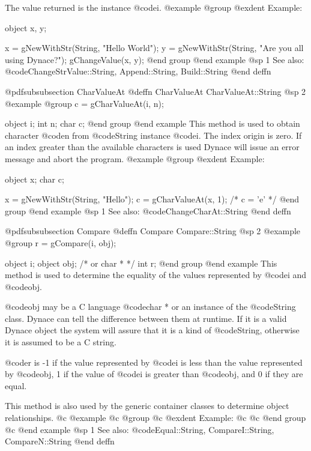 The value returned is the instance @code{i}.
@example
@group
@exdent Example:

object  x, y;

x = gNewWithStr(String, "Hello World");
y = gNewWithStr(String, "Are you all using Dynace?");
gChangeValue(x, y);
@end group
@end example
@sp 1
See also:  @code{ChangeStrValue::String, Append::String, Build::String}
@end deffn











@pdfsubsubsection {CharValueAt}
@deffn {CharValueAt} CharValueAt::String
@sp 2
@example
@group
c = gCharValueAt(i, n);

object  i;
int     n;
char    c;
@end group
@end example
This method is used to obtain character @code{n} from @code{String} instance
@code{i}.  The index origin is zero.  If an index greater than the available
characters is used Dynace will issue an error message and abort the program.
@example
@group
@exdent Example:

object  x;
char    c;

x = gNewWithStr(String, "Hello");
c = gCharValueAt(x, 1);
/*  c = 'e'  */
@end group
@end example
@sp 1
See also:  @code{ChangeCharAt::String}
@end deffn









@pdfsubsubsection {Compare}
@deffn {Compare} Compare::String
@sp 2
@example
@group
r = gCompare(i, obj);

object  i;
object  obj;  /*  or char *  */
int     r;
@end group
@end example
This method is used to determine the equality of the values represented
by @code{i} and @code{obj}.

@code{obj} may be a C language @code{char *} or an instance of the
@code{String} class.  Dynace can tell the difference between them at
runtime.  If it is a valid Dynace object the system will assure that it is
a kind of @code{String}, otherwise it is assumed to be a C string.

@code{r} is -1 if the value represented by @code{i} is less than the
value represented by @code{obj}, 1 if the value of @code{i} is greater
than @code{obj}, and 0 if they are equal.

This method is also used by the generic container classes to determine
object relationships.
@c @example
@c @group
@c @exdent Example:
@c
@c @end group
@c @end example
@sp 1
See also:  @code{Equal::String, CompareI::String, CompareN::String}
@end deffn








